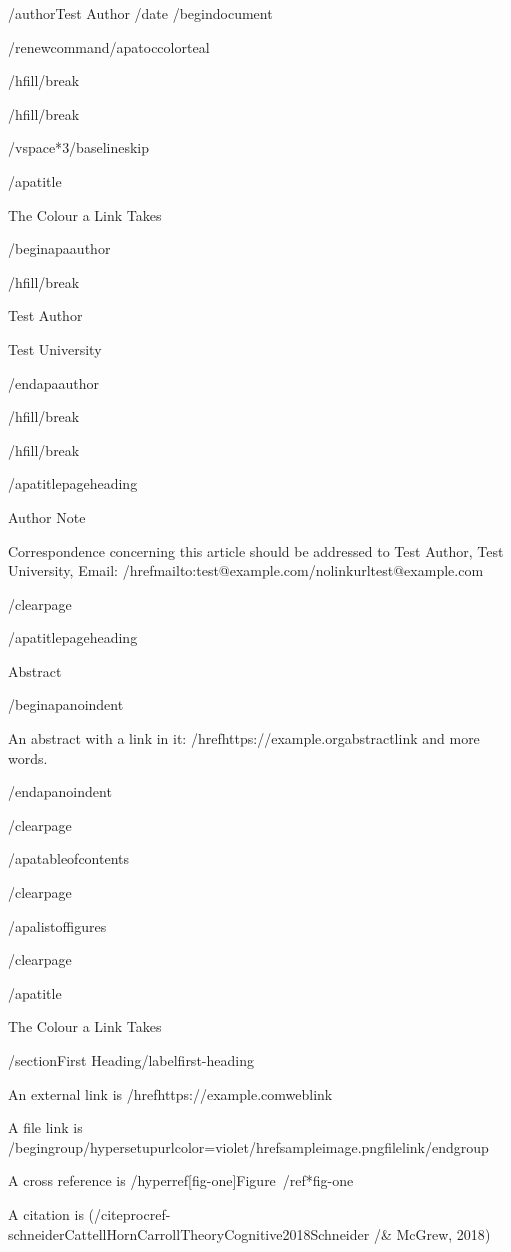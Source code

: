 /author{Test Author}
/date{}
/begin{document}


/renewcommand{/apatoccolor}{teal}

/hfill/break

/hfill/break

/vspace*{3/baselineskip}

/apatitle{

The Colour a Link Takes

}

/begin{apaauthor}

/hfill/break

Test Author

Test University

/end{apaauthor}

/hfill/break

/hfill/break

/apatitlepageheading{

Author Note

}

Correspondence concerning this article should be addressed to Test
Author, Test University, Email:
/href{mailto:test@example.com}{/nolinkurl{test@example.com}}

/clearpage

/apatitlepageheading{

Abstract

}

/begin{apanoindent}

An abstract with a link in it: /href{https://example.org}{abstractlink}
and more words.

/end{apanoindent}

/clearpage

/apatableofcontents

/clearpage

/apalistoffigures

/clearpage

/apatitle{

The Colour a Link Takes

}

/section{First Heading}/label{first-heading}

An external link is /href{https://example.com}{weblink}

A file link is
/begingroup/hypersetup{urlcolor=violet}/href{sampleimage.png}{filelink}/endgroup

A cross reference is /hyperref[fig-one]{Figure~/ref*{fig-one}}

A citation is
(/citeproc{ref-schneiderCattellHornCarrollTheoryCognitive2018}{Schneider
/& McGrew, 2018})

